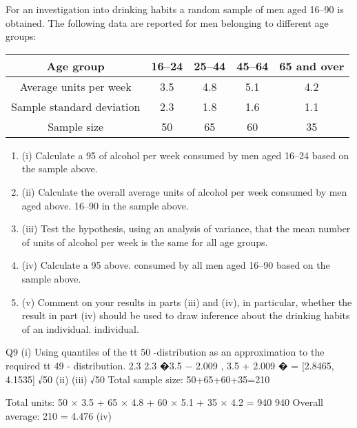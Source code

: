 \documentclass[a4paper,12pt]{article}
\begin{document}
For an investigation into drinking habits a random sample of men aged 16–90 is
obtained. The following data are reported for men belonging to different age groups:




\begin{center}
\begin{tabular}{|c|c|c|c|c|}
Age group & 16–24 & 25–44 & 45–64 & 65 and over \\ \hline
Average units per week & 3.5 & 4.8 & 5.1 & 4.2 \\ \hline
Sample standard deviation & 2.3 & 1.8 & 1.6 & 1.1 \\ \hline
Sample size & 50 & 65 & 60 & 35 \\ \hline
\end{tabular}
\end{center}

\begin{enumerate}
\item (i)
Calculate a 95%
of alcohol per week consumed by men aged 16–24 based on the sample above.

\item 
(ii) Calculate the overall average units of alcohol per week consumed by men aged
above.
16–90 in the sample above.

\item 
(iii) Test the hypothesis, using an analysis of variance, that the mean number of
units of alcohol per week is the same for all age groups. 
\item 
(iv) Calculate a 95%
above.
consumed by all men aged 16–90 based on the sample above.
\item 
(v) Comment on your results in parts (iii) and (iv), in particular, whether the result
in part (iv) should be used to draw inference about the drinking habits of an
individual.
individual.
\end{enumerate}
\newpage
Q9
(i)
Using quantiles of the tt 50 -distribution as an approximation to the required tt 49 -
distribution.
2.3
2.3
�3.5 − 2.009
, 3.5 + 2.009 � = [2.8465, 4.1535]
√50
(ii)
(iii)
√50
Total sample size: 50+65+60+35=210

Total units: 50 × 3.5 + 65 × 4.8 + 60 × 5.1 + 35 × 4.2 = 940
940
Overall average: 210 = 4.476
(iv)
\end{document}
